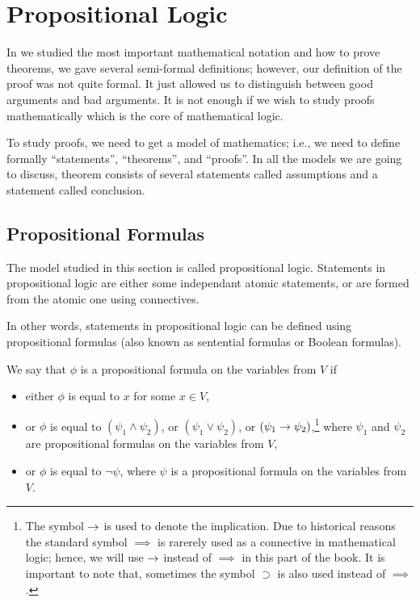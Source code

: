 \chapter{Propositional Logic}
In  we studied the most important
mathematical notation and how to prove theorems, we gave several semi-formal
definitions; however, our definition of the proof was not quite formal. It just
allowed us to distinguish between good arguments and bad arguments. It is not
enough if we wish to study proofs mathematically which is the core of
mathematical logic.

To study proofs, we need to get a model of mathematics; i.e., we need to define formally ``statements'', ``theorems'', and ``proofs''. In all the models we are
going to discuss, theorem consists of several statements called assumptions
and a statement called conclusion.

\section{Propositional Formulas}


The model studied in this section is called propositional logic. Statements in propositional logic are either some independant atomic statements, or
are formed from the atomic one using connectives.

In other words, statements in propositional logic can be defined using
propositional formulas (also known as sentential formulas or Boolean formulas).
\begin{definition}
  We say that $\phi$ is a propositional formula on the variables from
  $V$ if
  \begin{itemize}
    \item either $\phi$ is equal to $x$ for some $x \in V$,
    \item or $\phi$ is equal to $(\psi_1 \land \psi_2)$, or
      $(\psi_1 \lor \psi_2)$, or $(\psi_1 \rightarrow \psi_2)$,\footnote{%
        The symbol $\rightarrow$ is used to denote the implication.
        Due to historical reasons the standard symbol $\implies$ is rarerely
        used as a connective in mathematical logic; hence, we will use
        $\rightarrow$ instead of $\implies$ in this part of the book.
        It is important to note that, sometimes the symbol $\supset$ is also
        used instead of $\implies$.
      }
      where $\psi_1$ and $\psi_2$ are propositional formulas on the variables
      from $V$,
    \item or $\phi$ is equal to $\lnot \psi$, where $\psi$ is a propositional
      formula on the variables from $V$.
  \end{itemize}
\end{definition}

